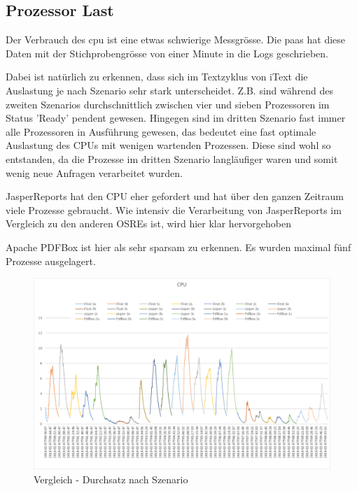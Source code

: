 \documentclass[main.tex]{subfiles}
\begin{document}
\subsection{Prozessor Last}

Der Verbrauch des \acrshort{cpu} ist eine etwas schwierige Messgrösse. Die \acrlong{paas} hat diese Daten mit der Stichprobengrösse von einer Minute in die Logs geschrieben.

Dabei ist natürlich zu erkennen, dass sich im Textzyklus von iText  die Auslastung je nach Szenario sehr stark unterscheidet. Z.B. sind während des zweiten Szenarios durchschnittlich zwischen vier und sieben Prozessoren im Status 'Ready' pendent gewesen. Hingegen sind im dritten Szenario fast immer alle Prozessoren in Ausführung gewesen, das bedeutet eine fast optimale Auslastung des CPUs mit wenigen wartenden Prozessen. Diese sind wohl so entstanden, da die Prozesse im dritten Szenario langläufiger waren und somit wenig neue Anfragen verarbeitet wurden.

JasperReports hat den CPU eher gefordert und hat über den ganzen Zeitraum viele Prozesse gebraucht. Wie intensiv die Verarbeitung von JasperReports im Vergleich zu den anderen OSREs ist, wird hier klar hervorgehoben



Apache PDFBox ist hier als sehr sparsam zu erkennen. Es wurden maximal fünf Prozesse ausgelagert. 
\begin{figure}[!hb]
\includegraphics[width=\textwidth]{mainpart/4_analyse_img/CPUVergleich.png}
 \caption{Vergleich - Durchsatz nach Szenario}
 \label{figure:cpuVergleich}
\end{figure}
\end{document}

